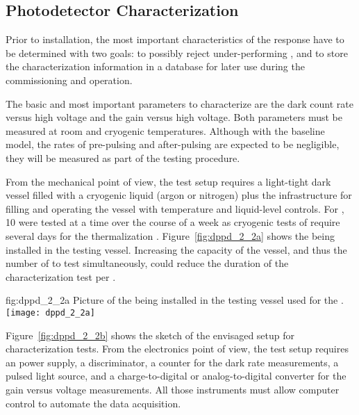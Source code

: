 \subsection{Photodetector Characterization}
\label{sec:dp-pds-selection-characterization}

Prior to installation, the most important characteristics of the  response have to be determined with two goals: to possibly reject under-performing , and to store the characterization information in a database for later use during the  commissioning and operation.

The basic and most important parameters to characterize are the dark count rate versus high voltage and the gain versus high voltage. Both parameters must be measured at room and  cryogenic temperatures. Although with the baseline  model, the rates of pre-pulsing and after-pulsing are expected to be negligible, they will be measured as part of the testing procedure. 

From the mechanical point of view, the test setup requires a light-tight dark vessel filled with a cryogenic liquid (argon or nitrogen) plus the infrastructure for filling and operating the vessel with temperature and liquid-level controls. For , \num{10}  were tested at a time over the course of a week as cryogenic tests of  require several days for the  thermalization \cite{Belver:2018erf}. Figure~\ref{fig:dppd_2_2a} shows the    being installed in the testing vessel.
Increasing the capacity of the vessel, and thus the number of  to test simultaneously,
could reduce the duration of the characterization test per .

\begin{dunefigure}{fig:dppd_2_2a}
{Picture of the  being installed in the testing vessel used for the  .}
\texttt{[image: dppd\_2\_2a]}
\end{dunefigure}

Figure~\ref{fig:dppd_2_2b} shows the sketch of the envisaged setup for  characterization tests. From the electronics point of view, the test setup requires an  power supply, a discriminator, a counter for the dark rate measurements, a pulsed light source, and a charge-to-digital or analog-to-digital converter for the  gain versus voltage measurements. All those instruments must allow computer control to automate the data acquisition.


